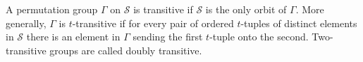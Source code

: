A permutation group $\Gamma$ on $\mathcal{S}$ is transitive if $\mathcal{S}$ is the only orbit of $\Gamma$. More generally, $\Gamma$ is $t$-transitive if for every pair of ordered $t$-tuples of distinct elements in $\mathcal{S}$ there is an element in $\Gamma$ sending the first $t$-tuple onto the second. Two-transitive groups are called doubly transitive.
